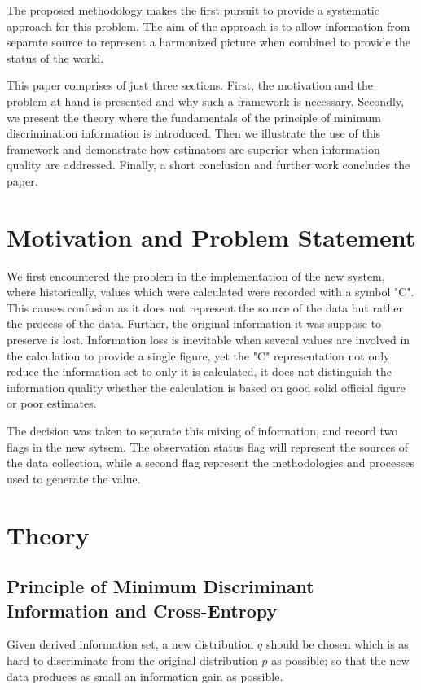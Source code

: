 \documentclass[nojss]{jss}
\begin{document}
The proposed methodology makes the first pursuit to provide a
systematic approach for this problem. The aim of the approach is to
allow information from separate source to represent a harmonized
picture when combined to provide the status of the world.

This paper comprises of just three sections. First, the motivation and
the problem at hand is presented and why such a framework is
necessary. Secondly, we present the theory where the fundamentals of
the principle of minimum discrimination information is
introduced. Then we illustrate the use of this framework and
demonstrate how estimators are superior when information quality are
addressed. Finally, a short conclusion and further work concludes the
paper.

\section{Motivation and Problem Statement}

We first encountered the problem in the implementation of the new
system, where historically, values which were calculated were recorded
with a symbol "C". This causes confusion as it does not represent the
source of the data but rather the process of the data. Further, the
original information it was suppose to preserve is lost. Information
loss is inevitable when several values are involved in the calculation
to provide a single figure, yet the "C" representation not only reduce
the information set to only it is calculated, it does not distinguish
the information quality whether the calculation is based on good solid
official figure or poor estimates.

The decision was taken to separate this mixing of information, and
record two flags in the new sytsem. The observation status flag will
represent the sources of the data collection, while a second flag
represent the methodologies and processes used to generate the value.

\section{Theory}


\subsection{Principle of Minimum Discriminant Information and Cross-Entropy}

Given derived information set, a new distribution $q$ should be chosen
which is as hard to discriminate from the original distribution $p$ as
possible; so that the new data produces as small an information gain
as possible.
\end{document}
